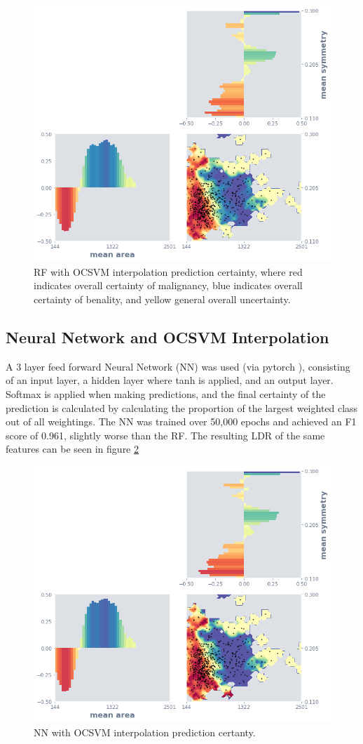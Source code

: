 \documentclass[a4paper, twocolumn]{article}
\begin{document}
\begin{figure}
\centering
\includegraphics[width=0.8\columnwidth]{img/interp_rf_ocsvm.png}
\caption{RF with OCSVM interpolation prediction certainty, where red indicates overall certainty of malignancy, blue indicates overall certainty of benality, and yellow general overall uncertainty.}
\label{fig:interp-rf-ocsvm}
\end{figure}

\subsection{Neural Network and OCSVM Interpolation}

A 3 layer feed forward Neural Network (NN) was used (via pytorch \cite{paszke2017automatic}), consisting of an input layer, a hidden layer where tanh is applied, and an output layer. Softmax is applied when making predictions, and the final certainty of the prediction is calculated by calculating the proportion of the largest weighted class out of all weightings. The NN was trained over 50,000 epochs and achieved an F1 score of 0.961, slightly worse than the RF. The resulting LDR of the same features can be seen in figure \ref{fig:interp-nn-ocsvm}

\begin{figure}
\centering
\includegraphics[width=0.8\columnwidth]{img/interp_nn_ocsvm.png}
\caption{NN with OCSVM interpolation prediction certanty.}
\label{fig:interp-nn-ocsvm}
\end{figure}
\end{document}
